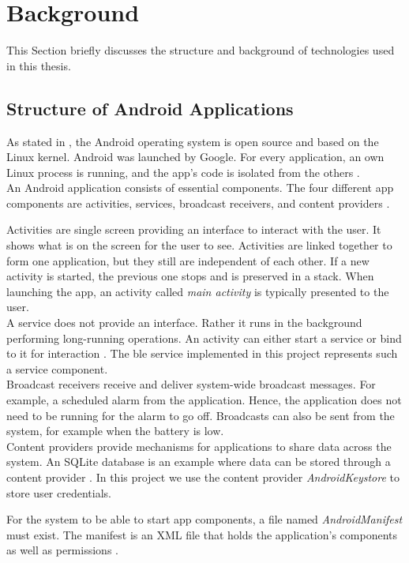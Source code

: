 \section{Background} \label{background}
This Section briefly discusses the structure and background of technologies used in this thesis.

\subsection*{Structure of Android Applications}
As stated in \cite{6104696}, the Android operating system is open source and based on the Linux kernel. Android was launched by Google. For every application, an own Linux process is running, and the app's code is isolated from the others \cite{AndroidFundamentals}. \\
An Android application consists of essential components. The four different app components are activities, services, broadcast receivers, and content providers \cite{6104696}.

Activities are single screen providing an interface to interact with the user. It shows what is on the screen for the user to see. Activities are linked together to form one application, but they still are independent of each other. If a new activity is started, the previous one stops and is preserved in a stack. When launching the app, an activity called \textit{main activity} is typically presented to the user. \\
A service does not provide an interface. Rather it runs in the background performing long-running operations. An activity can either start a service or bind to it for interaction \cite{AndroidFundamentals}. The \gls{ble} service implemented in this project represents such a service component. \\
Broadcast receivers receive and deliver system-wide broadcast messages. For example, a scheduled alarm from the application. Hence, the application does not need to be running for the alarm to go off. Broadcasts can also be sent from the system, for example when the battery is low. \\
Content providers provide mechanisms for applications to share data across the system. An SQLite database is an example where data can be stored through a content provider \cite{AndroidFundamentals}. In this project we use the content provider \textit{AndroidKeystore} to store user credentials. 

For the system to be able to start app components, a file named \textit{AndroidManifest} must exist. The manifest is an XML file that holds the application's components as well as permissions \cite{AndroidFundamentals}.

